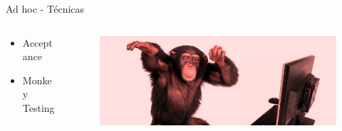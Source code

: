 \documentclass[aspectratio=169]{beamer}
\begin{document}
\begin{frame}{Ad hoc - Técnicas}
\begin{columns}[T]
	\begin{column}[T]{4cm}
		\begin{itemize}
			\item Acceptance
			\item Monkey Testing
		\end{itemize}
	\end{column}
	\begin{column}[T]{6cm} %
		\begin{figure}
			\centering
			\includegraphics[width=\linewidth]{Images/adhoctesting.jpg}
		\end{figure}
	\end{column}
\end{columns}
\end{frame}
\end{document}
